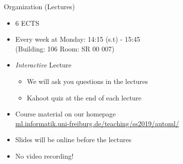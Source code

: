 \begin{frame}[c]{Organization (Lectures)}

\begin{itemize}
  \item $6$ ECTS
  \item Every week at Monday: 14:15 (s.t) - 15:45\\ (Building: 106 Room: SR 00 007)
  \item \emph{Interactive} Lecture 
  \begin{itemize}
    \item We will ask you questions in the lectures
    \item Kahoot quiz at the end of each lecture
  \end{itemize}
  \item Course material on our homepage\\
  		{\small \url{ml.informatik.uni-freiburg.de/teaching/ss2019/automl/}}
  \item Slides will be online before the lectures
  \item No video recording!
\end{itemize}

\end{frame}
